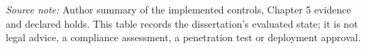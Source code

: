 \begin{table}[p]
  \caption{Governance controls, evidence and remaining requirements}
  \label{tab:gov-residual-risk}

  \vspace{4pt}
  \parbox{\textwidth}{\scriptsize
    \textit{Source note:} Author summary of the implemented controls, Chapter 5 evidence and
    declared holds. This table records the dissertation's evaluated state; it is not legal advice,
    a compliance assessment, a penetration test or deployment approval.}
\end{table}
\clearpage
